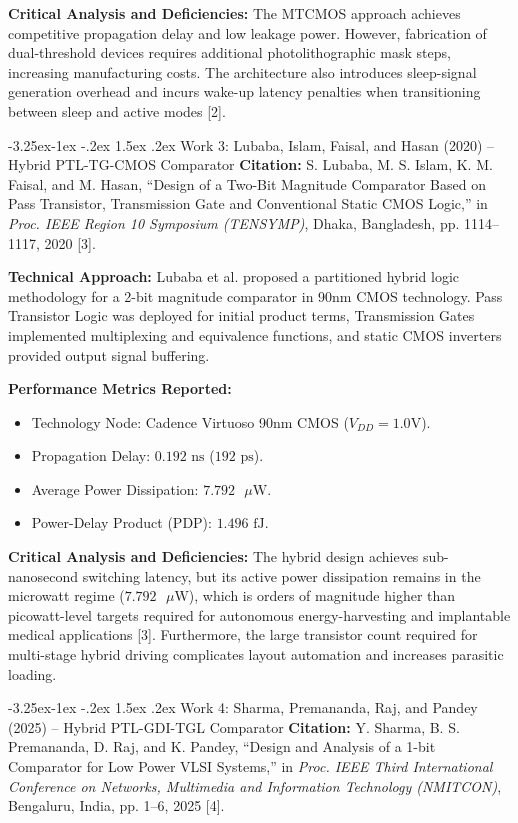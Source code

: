 \documentclass[12pt,a4paper,oneside]{report}
\makeatletter
\renewcommand\subsection{\@startsection{subsection}{2}{\z@}%
                                     {-3.25ex\@plus -1ex \@minus -.2ex}%
                                     {1.5ex \@plus .2ex}%
                                     {\normalfont\normalsize\bfseries\itshape}}
\makeatother
\begin{document}
\noindent\textbf{Critical Analysis and Deficiencies:} The MTCMOS approach achieves competitive propagation delay and low leakage power. However, fabrication of dual-threshold devices requires additional photolithographic mask steps, increasing manufacturing costs. The architecture also introduces sleep-signal generation overhead and incurs wake-up latency penalties when transitioning between sleep and active modes [2].

\subsection{Work 3: Lubaba, Islam, Faisal, and Hasan (2020) -- Hybrid PTL-TG-CMOS Comparator}
\textbf{Citation:} S. Lubaba, M. S. Islam, K. M. Faisal, and M. Hasan, ``Design of a Two-Bit Magnitude Comparator Based on Pass Transistor, Transmission Gate and Conventional Static CMOS Logic,'' in \textit{Proc. IEEE Region 10 Symposium (TENSYMP)}, Dhaka, Bangladesh, pp. 1114--1117, 2020 [3].

\noindent\textbf{Technical Approach:} Lubaba et al. proposed a partitioned hybrid logic methodology for a 2-bit magnitude comparator in 90nm CMOS technology. Pass Transistor Logic was deployed for initial product terms, Transmission Gates implemented multiplexing and equivalence functions, and static CMOS inverters provided output signal buffering.

\noindent\textbf{Performance Metrics Reported:}
\begin{itemize}
\item Technology Node: Cadence Virtuoso 90nm CMOS ($V_{DD} = 1.0\text{V}$).
\item Propagation Delay: $0.192\text{ ns}$ ($192\text{ ps}$).
\item Average Power Dissipation: $7.792\text{ }\mu\text{W}$.
\item Power-Delay Product (PDP): $1.496\text{ fJ}$.
\end{itemize}

\noindent\textbf{Critical Analysis and Deficiencies:} The hybrid design achieves sub-nanosecond switching latency, but its active power dissipation remains in the microwatt regime ($7.792\text{ }\mu\text{W}$), which is orders of magnitude higher than picowatt-level targets required for autonomous energy-harvesting and implantable medical applications [3]. Furthermore, the large transistor count required for multi-stage hybrid driving complicates layout automation and increases parasitic loading.

\subsection{Work 4: Sharma, Premananda, Raj, and Pandey (2025) -- Hybrid PTL-GDI-TGL Comparator}
\textbf{Citation:} Y. Sharma, B. S. Premananda, D. Raj, and K. Pandey, ``Design and Analysis of a 1-bit Comparator for Low Power VLSI Systems,'' in \textit{Proc. IEEE Third International Conference on Networks, Multimedia and Information Technology (NMITCON)}, Bengaluru, India, pp. 1--6, 2025 [4].
\end{document}
